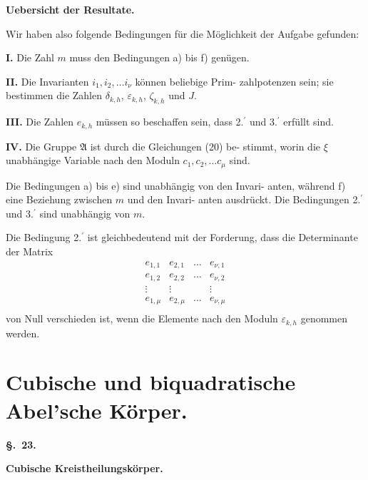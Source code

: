 \documentclass[12pt,a4paper]{article}
\begin{document}
\medskip
\begin{center}\textbf{Uebersicht der Resultate.}\end{center}

Wir haben also folgende Bedingungen f\"ur die M\"oglichkeit
der Aufgabe gefunden:

\medskip
\noindent\textbf{I.} Die Zahl $m$ muss den Bedingungen a) bis f) gen\"ugen.

\medskip
\noindent\textbf{II.} Die Invarianten $i_1, i_2, \ldots i_\nu$ k\"onnen beliebige Prim-
zahlpotenzen sein; sie bestimmen die Zahlen
$\delta_{k,h}$, $\varepsilon_{k,h}$, $\zeta_{k,h}$ und $J$.

\medskip
\noindent\textbf{III.} Die Zahlen $e_{k,h}$ m\"ussen so beschaffen sein, dass
2.$^\prime$ und 3.$^\prime$ erf\"ullt sind.

\medskip
\noindent\textbf{IV.} Die Gruppe $\mathfrak{A}$ ist durch die Gleichungen (20) be-
stimmt, worin die $\xi$ unabh\"angige Variable nach
den Moduln $c_1, c_2, \ldots c_\mu$ sind.

\medskip
Die Bedingungen a) bis e) sind unabh\"angig von den Invari-
anten, w\"ahrend f) eine Beziehung zwischen $m$ und den Invari-
anten ausdr\"uckt. Die Bedingungen 2.$^\prime$ und 3.$^\prime$ sind unabh\"angig
von $m$.

Die Bedingung 2.$^\prime$ ist gleichbedeutend mit der Forderung, dass
die Determinante der Matrix
\[\begin{array}{cccc}
e_{1,1} & e_{2,1} & \ldots & e_{\nu,1} \\
e_{1,2} & e_{2,2} & \ldots & e_{\nu,2} \\
\vdots & \vdots & & \vdots \\
e_{1,\mu} & e_{2,\mu} & \ldots & e_{\nu,\mu} \\
\end{array}\]
von Null verschieden ist, wenn die Elemente nach den Moduln
$\varepsilon_{k,h}$ genommen werden.

\newpage
\section{Cubische und biquadratische Abel'sche K\"orper.}
\label{sec:23}

\begin{center}\textbf{\S.~23.}\end{center}
\begin{center}\large\bfseries Cubische Kreistheilungsk\"orper.\end{center}
\end{document}
